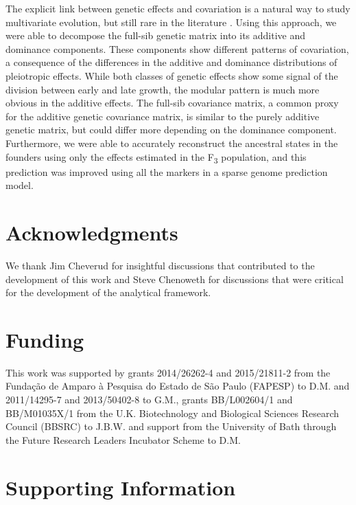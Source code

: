\begin{refsection}
The explicit link between genetic effects and covariation is a natural
way to study multivariate evolution, but still rare in the literature \parencite{Kelly2009-bj}.
Using this approach, we were able to decompose the full-sib genetic matrix into its
additive and dominance components. These components show different
patterns of covariation, a consequence of the differences in the
additive and dominance distributions of pleiotropic effects. While both
classes of genetic effects show some signal of the division between
early and late growth, the modular pattern is much more obvious in the
additive effects. The full-sib covariance matrix, a common proxy for the
additive genetic covariance matrix, is similar to the purely additive
genetic matrix, but could differ more depending on the dominance
component. Furthermore, we were able to accurately reconstruct the
ancestral states in the founders using only the effects estimated in
the F\textsubscript{3} population, and this prediction was improved using all the
markers in a sparse genome prediction model.


\section{Acknowledgments}
We thank Jim Cheverud for insightful discussions that contributed to the
development of this work and Steve Chenoweth for discussions that were
critical for the development of the analytical framework.


\section{Funding}

This work was supported by grants 2014/26262-4 and 2015/21811-2 from the
Fundação de Amparo à Pesquisa do Estado de São Paulo (FAPESP) to D.M.
and 2011/14295-7 and 2013/50402-8 to G.M., grants BB/L002604/1 and
BB/M01035X/1 from the U.K. Biotechnology and Biological Sciences
Research Council (BBSRC) to J.B.W. and support from the University of
Bath through the Future Research Leaders Incubator Scheme to D.M.

\printbibliography

\newpage

\section*{Supporting Information}

\makeatletter
\renewcommand{\thefigure}{S\arabic{chapter}.\arabic{figure}}
\makeatother


\end{refsection}
